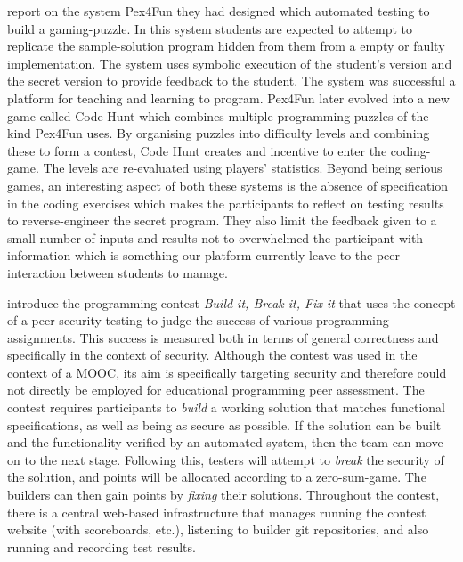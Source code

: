 \documentclass[sigplan,10pt,review]{acmart}\settopmatter{printfolios=true}
\begin{document}
\citet{TildHaXieGulBis_ICSE-2013} report on the system Pex4Fun they
had designed which automated testing to build a gaming-puzzle.  In
this system students are expected to attempt to replicate the
sample-solution program hidden from them from a empty or faulty
implementation. The system uses symbolic execution of the student's
version and the secret version to provide feedback to the student.
The system was successful a platform for teaching and learning to
program.  Pex4Fun later evolved into a new game called Code Hunt
\citep{BisHorXieTilHal_ICSE-2015,HorBisdHaTil_CHESE-2015} which
combines multiple programming puzzles of the kind Pex4Fun uses. By
organising puzzles into difficulty levels and combining these to form
a contest, Code Hunt creates and incentive to enter the
coding-game. The levels are re-evaluated using players' statistics.
%
Beyond being serious games, an interesting aspect of both these
systems is the absence of specification in the coding exercises which
makes the participants to reflect on testing results to
reverse-engineer the secret program.  They also limit the feedback
given to a small number of inputs and results not to overwhelmed the
participant with information which is something our platform currently
leave to the peer interaction between students to manage.


\citet{Rue+Hic+Par+Lev+Mem+Pla+Mar_CCS-2016} introduce the programming
contest \emph{Build-it, Break-it, Fix-it} that uses the concept of a
peer security testing to judge the success of various programming
assignments. This success is measured both in terms of general
correctness and specifically in the context of security. Although the
contest was used in the context of a \ac{MOOC}, its aim is
specifically targeting security and therefore could not directly be
employed for educational programming peer assessment.
%
The contest requires participants to \textit{build} a working solution
that matches functional specifications, as well as being as secure as
possible. If the solution can be built and the functionality verified
by an automated system, then the team can move on to the next
stage. Following this, testers will attempt to \textit{break} the
security of the solution, and points will be allocated according to a
zero-sum-game. The builders can then gain points by \textit{fixing}
their solutions.  Throughout the contest, there is a central web-based
infrastructure that manages running the contest website (with
scoreboards, etc.), listening to builder git repositories, and also
running and recording test results.
\end{document}
